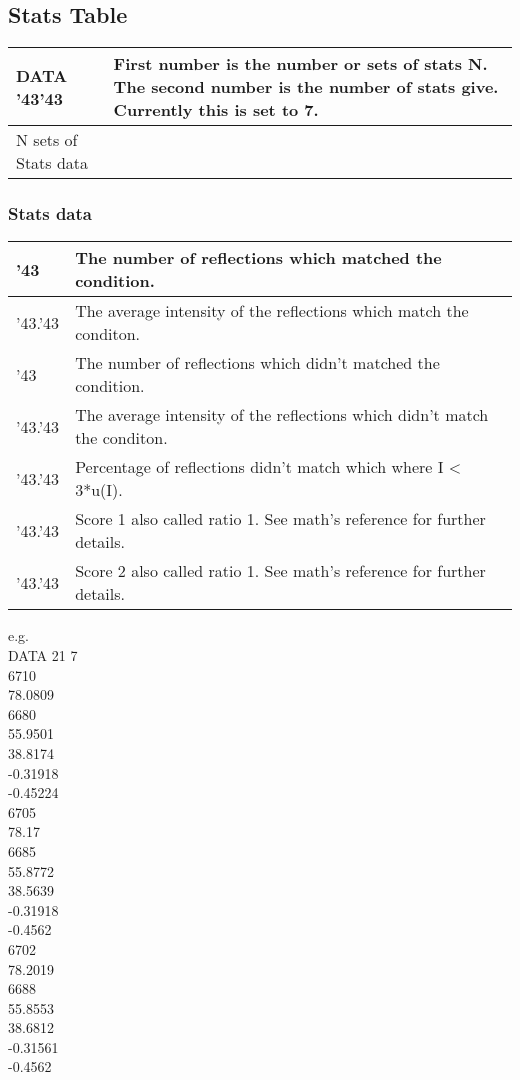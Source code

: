 \documentclass[11pt]{article}
\newcommand{\hash}{\char '43} %
\begin{document}
\subsection{Stats Table}
\begin{table}[h]
\begin{tabular}{|l|l|}\hline
DATA \hash  \hash & First number is the number or sets of stats N. The second number is the number of stats give. Currently this is set to 7.\\
\hline
N sets of Stats data &\\\hline
\end{tabular}
\end{table}
\subsubsection{Stats data}
\begin{table}[h]
\begin{tabular}{|l|l|}\hline
\hash & The number of reflections which matched the condition.\\\hline
\hash.\hash & The average intensity of the reflections which match the conditon.\\\hline
\hash & The number of reflections which didn't matched the condition.\\\hline
\hash.\hash & The average intensity of the reflections which didn't match the conditon.\\\hline
\hash.\hash & Percentage of reflections didn't match which where I < 3*u(I).\\\hline
\hash.\hash & Score 1 also called ratio 1. See math's reference for further details.\\\hline
\hash.\hash & Score 2 also called ratio 1. See math's reference for further details.\\\hline
\hline
\end{tabular}
\end{table}
e.g.\\
DATA 21 7\\
6710\\
78.0809\\
6680\\
55.9501\\
38.8174\\
-0.31918\\
-0.45224\\
6705\\
78.17\\
6685\\
55.8772\\
38.5639\\
-0.31918\\
-0.4562\\
6702\\
78.2019\\
6688\\
55.8553\\
38.6812\\
-0.31561\\
-0.4562\\
 
\end{document}
